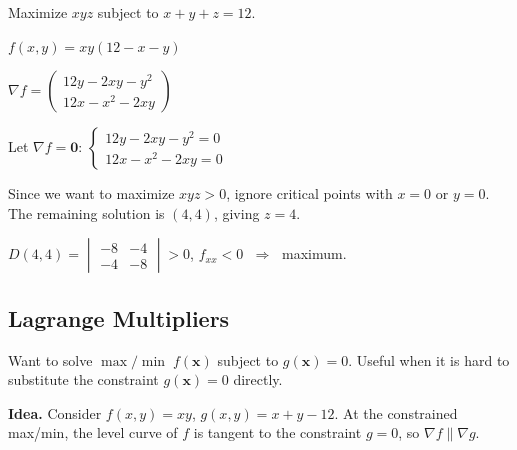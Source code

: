 \begin{example}
  Maximize $xyz$ subject to $x+y+z=12$.

  $f(x,y) = xy(12-x-y)$

  $\nabla f =
    \begin{pmatrix}
      12y-2xy-y^{2} \\12x-x^{2}-2xy
    \end{pmatrix}
  $

  Let $\nabla f=\mathbf{0}$:
  $
    \begin{cases}
      12y-2xy-y^{2}=0 \\12x-x^{2}-2xy=0
    \end{cases}
  $

  Since we want to maximize $xyz>0$, ignore critical points with
  $x=0$ or $y=0$. The remaining solution is $(4,4)$, giving $z=4$.

  $D(4,4) =
    \begin{vmatrix}
      -8 & -4 \\-4&-8
    \end{vmatrix}
    > 0$, \;
  $f_{xx}<0$ $\;\Longrightarrow\;$ maximum.
\end{example}

\subsection{Lagrange Multipliers}

Want to solve $\max/\min\; f(\mathbf{x})$ subject to $g(\mathbf{x})=0$.
Useful when it is hard to substitute the constraint $g(\mathbf{x})=0$ directly.

\textbf{Idea.}
Consider $f(x,y)=xy$, $g(x,y)=x+y-12$.
At the constrained max/min, the level curve of $f$ is tangent to the
constraint $g=0$, so $\nabla f\parallel\nabla g$.

